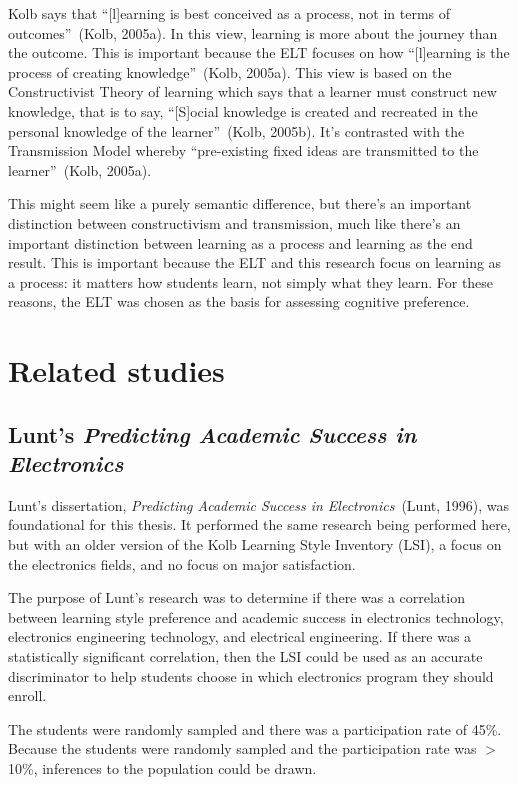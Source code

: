 Kolb says that ``[l]earning is best conceived as a process, not in terms of outcomes''~(Kolb, 2005a). In this view, learning is more about the journey than the outcome. This is important because the ELT focuses on how ``[l]earning is the process of creating knowledge''~(Kolb, 2005a). This view is based on the Constructivist Theory of learning which says that a learner must construct new knowledge, that is to say, ``[S]ocial knowledge is created and recreated in the personal knowledge of the learner''~(Kolb, 2005b). It's contrasted with the Transmission Model whereby ``pre-existing fixed ideas are transmitted to the learner''~(Kolb, 2005a).

This might seem like a purely semantic difference, but there's an important distinction between constructivism and transmission, much like there's an important distinction between learning as a process and learning as the end result. This is important because the ELT and this research focus on learning as a process: it matters how students learn, not simply what they learn. For these reasons, the ELT was chosen as the basis for assessing cognitive preference.

\section{Related studies}
\subsection{Lunt's \textit{Predicting Academic Success in Electronics}}
Lunt's dissertation, \textit{Predicting Academic Success in Electronics}~(Lunt, 1996), was foundational for this thesis. It performed the same research being performed here, but with an older version of the Kolb Learning Style Inventory (LSI), a focus on the electronics fields, and no focus on major satisfaction.

The purpose of Lunt's research was to determine if there was a correlation between learning style preference and academic success in electronics technology, electronics engineering technology, and electrical engineering. If there was a statistically significant correlation, then the LSI could be used as an accurate discriminator to help students choose in which electronics program they should enroll.

The students were randomly sampled and there was a participation rate of 45\%. Because the students were randomly sampled and the participation rate was $>$10\%, inferences to the population could be drawn.

